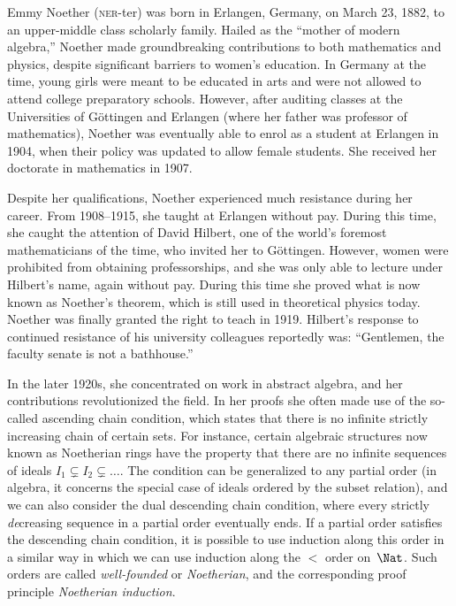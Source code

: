 \documentclass[../../../include/open-logic-section]{subfiles}
\begin{document}



Emmy Noether (\textsc{ner}-ter) was born in Erlangen, Germany, on
March 23, 1882, to an upper-middle class scholarly family. Hailed as
the ``mother of modern algebra,'' Noether made groundbreaking
contributions to both mathematics and physics, despite significant
barriers to women's education. In Germany at the time, young girls
were meant to be educated in arts and were not allowed to attend
college preparatory schools.  However, after auditing classes at the
Universities of G\"{o}ttingen and Erlangen (where her father was
professor of mathematics), Noether was eventually able to enrol as a
student at Erlangen in 1904, when their policy was updated to allow
female students. She received her doctorate in mathematics in 1907.

Despite her qualifications, Noether experienced much resistance during
her career. From 1908--1915, she taught at Erlangen without
pay. During this time, she caught the attention of David Hilbert, one
of the world's foremost mathematicians of the time, who invited her to
G\"{o}ttingen. However, women were prohibited from obtaining
professorships, and she was only able to lecture under Hilbert's name,
again without pay. During this time she proved what is now known as
Noether's theorem, which is still used in theoretical physics
today. Noether was finally granted the right to teach in 1919.
Hilbert's response to continued resistance of his university
colleagues reportedly was: ``Gentlemen, the faculty senate is not a
bathhouse.''

In the later 1920s, she concentrated on work in abstract algebra, and
her contributions revolutionized the field.  In her proofs she often
made use of the so-called ascending chain condition, which states that
there is no infinite strictly increasing chain of certain sets. For
instance, certain algebraic structures now known as Noetherian rings
have the property that there are no infinite sequences of ideals $I_1
\subsetneq I_2 \subsetneq \dots$.  The condition can be generalized to
any partial order (in algebra, it concerns the special case of ideals
ordered by the subset relation), and we can also consider the dual
descending chain condition, where every strictly \emph{de}creasing
sequence in a partial order eventually ends.  If a partial order
satisfies the descending chain condition, it is possible to use
induction along this order in a similar way in which we can use
induction along the $<$ order on~$\Nat$.  Such orders are called
\emph{well-founded} or \emph{Noetherian}, and the corresponding proof
principle \emph{Noetherian induction}.
\end{document}
